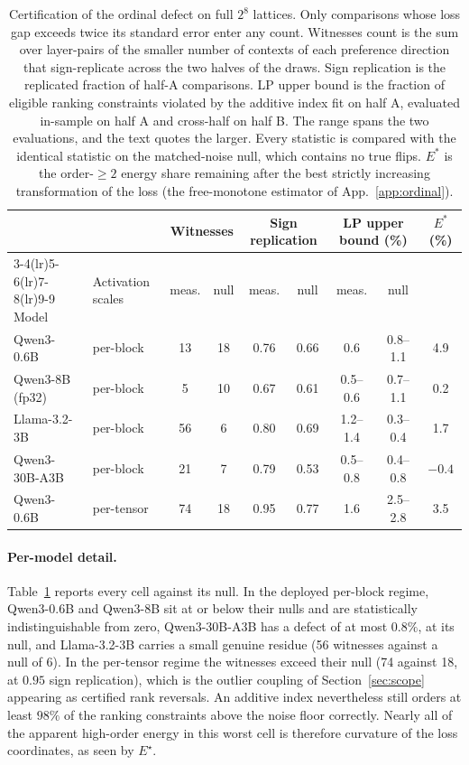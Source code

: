\begin{table}[t]
    \centering
    \small
    \begin{tabular}{llccccccc}
      \toprule
      & & \multicolumn{2}{c}{Witnesses} & \multicolumn{2}{c}{Sign replication} & \multicolumn{2}{c}{LP upper bound (\%)} & $E^*$ (\%) \\
      \cmidrule(lr){3-4}\cmidrule(lr){5-6}\cmidrule(lr){7-8}\cmidrule(lr){9-9}
      Model & Activation scales & meas. & null & meas. & null & meas. & null & \\
      \midrule
      Qwen3-0.6B & per-block & 13 & 18 & 0.76 & 0.66 & 0.6 & 0.8--1.1 & 4.9 \\
      Qwen3-8B (fp32) & per-block & 5 & 10 & 0.67 & 0.61 & 0.5--0.6 & 0.7--1.1 & 0.2 \\
      Llama-3.2-3B & per-block & 56 & 6 & 0.80 & 0.69 & 1.2--1.4 & 0.3--0.4 & 1.7 \\
      Qwen3-30B-A3B & per-block & 21 & 7 & 0.79 & 0.53 & 0.5--0.8 & 0.4--0.8 & $-0.4$ \\
      \midrule
      Qwen3-0.6B & per-tensor & 74 & 18 & 0.95 & 0.77 & 1.6 & 2.5--2.8 & 3.5 \\
      \bottomrule
    \end{tabular}
    \caption{Certification of the ordinal defect on full $2^8$ lattices. 
    Only comparisons whose loss gap exceeds twice its standard error enter any
    count. Witnesses count is the sum over layer-pairs of the smaller number of contexts of each preference direction
    that sign-replicate across the two halves of the draws. Sign replication is the replicated fraction of half-A comparisons.
    LP upper bound is the fraction of eligible ranking constraints
    violated by the additive index fit on half A, evaluated in-sample on half A and cross-half on half B.
    The range spans the two evaluations, and the text quotes the larger. Every statistic is compared
    with the identical statistic on the matched-noise null, which contains no true flips. $E^*$ is the
    order-$\ge 2$ energy share remaining after the best strictly increasing transformation of the loss
    (the free-monotone estimator of App.~\ref{app:ordinal}).}
    \label{tab:ordinal}
  \end{table}

\paragraph{Per-model detail.} Table~\ref{tab:ordinal} reports every cell against its null. In the deployed
per-block regime, Qwen3-0.6B and Qwen3-8B sit at or below their nulls and are
statistically indistinguishable from zero, Qwen3-30B-A3B has a defect of at most $0.8\%$, at its null, and
Llama-3.2-3B carries a small genuine residue (56 witnesses against a null of 6). In the per-tensor regime
the witnesses exceed their null (74 against 18, at $0.95$ sign replication), which is the outlier
coupling of Section~\ref{sec:scope} appearing as certified rank reversals. An additive index nevertheless still
orders at least $98\%$ of the ranking constraints above the noise floor correctly. Nearly all of the apparent high-order energy in this
worst cell is therefore curvature of the loss coordinates, as seen by $E^\star$.

